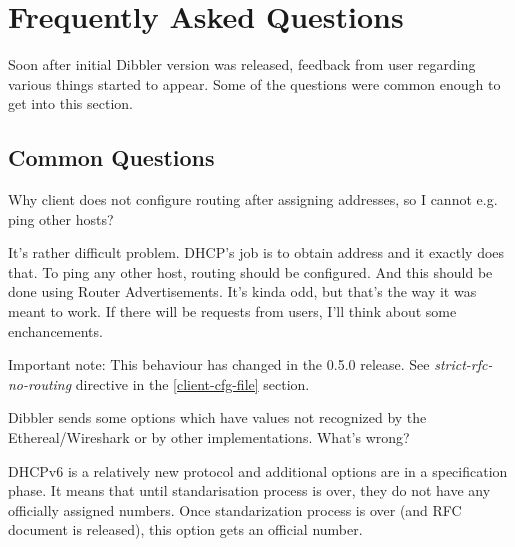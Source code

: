 

\section{Frequently Asked Questions}

Soon after initial Dibbler version was released, feedback from user
regarding various things started to appear. Some of the questions were
common enough to get into this section.

\subsection{Common Questions}

\Q Why client does not configure routing after assigning addresses, so
I cannot e.g. ping other hosts?

\A It's rather difficult problem. DHCP's job is to obtain address and
it exactly does that. To ping any other host, routing should be 
configured. And this should be done using Router Advertisements. It's
kinda odd, but that's the way it was meant to work. If there will be
requests from users, I'll think about some enchancements.

Important note: This behaviour has changed in the 0.5.0 release. See
\emph{strict-rfc-no-routing} directive in the \ref{client-cfg-file}
section. 

\Q Dibbler sends some options which have values not recognized by the
Ethereal/Wireshark or by other implementations. What's wrong?

\A DHCPv6 is a relatively new protocol and additional options are in a
specification phase. It means that until standarisation process is
over, they do not have any officially assigned numbers. Once
standarization process is over (and RFC document is released), this
option gets an official number. 

